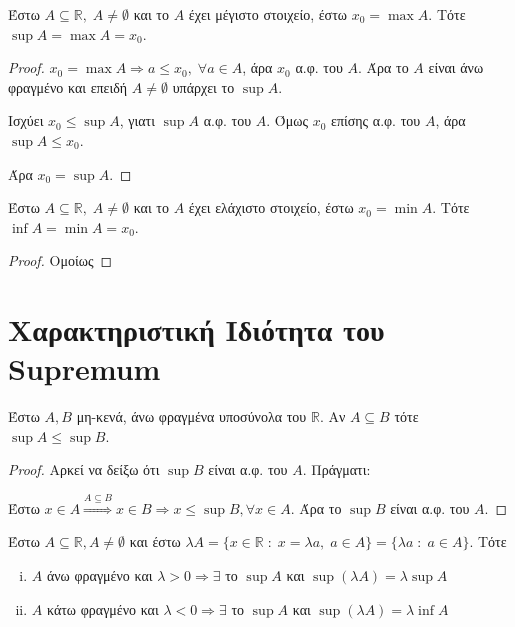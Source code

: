 \documentclass[main.tex]{subfiles}
\begin{document}
\begin{prop}
    Έστω $ A \subseteq \mathbb{R}, \; A \neq \emptyset $ και το $A$ έχει μέγιστο 
    στοιχείο, έστω $ x_{0} = \max A $. Τότε $ \sup A = \max A = x_{0}$.
\end{prop}

\begin{proof}
\item {}
    $ x_{0} = \max A \Rightarrow a \leq x_{0}, \; \forall a \in A $, άρα $ x_{0} $ α.φ. 
    του $A$. Άρα το $A$ είναι άνω φραγμένο και επειδή $ A \neq \emptyset $ υπάρχει 
    το $ \sup A $. 

    Ισχύει $ x_{0} \leq \sup A $, γιατι $ \sup A $ α.φ. του $A$.
    Όμως $ x_{0} $ επίσης α.φ. του $A$, άρα $ \sup A \leq x_{0} $.

    Άρα $ x_{0}= \sup A $.
\end{proof}

\begin{prop}
    Έστω $ A \subseteq \mathbb{R}, \; A \neq \emptyset $ και το $A$ έχει ελάχιστο
    στοιχείο, έστω $ x_{0} = \min A $. Τότε $ \inf A = \min A = x_{0}$.
\end{prop}

\begin{proof}
   Ομοίως 
\end{proof}

\section{Χαρακτηριστική Ιδιότητα του Supremum}

\begin{prop}\label{prop:leqsup}
    Έστω $ A, B $ μη-κενά, άνω φραγμένα υποσύνολα του $ \mathbb{R} $. Αν $ A \subseteq 
    B$ τότε $ \sup A \leq \sup B $.
\end{prop}

\begin{proof}
\item {}
Αρκεί να δείξω ότι $ \sup B $ είναι α.φ. του $A$. Πράγματι:

Έστω $ x \in A \overset{A \subseteq B}{\Rightarrow } x \in B \Rightarrow 
x \leq \sup B, \forall x \in A$. Άρα το $ \sup B $ είναι α.φ. του $A$.
\end{proof}

\begin{prop}
    Έστω $ A \subseteq \mathbb{R}, A \neq \emptyset $ και έστω $ \lambda A = 
    \{ x \in \mathbb{R} \; : \; x = \lambda a, \; a \in A \} = \{ \lambda a \; : \; 
    a \in A\} $. Τότε
    \begin{enumerate}[i)]
        \item $ A $ άνω φραγμένο και $ \lambda >0 \Rightarrow \exists $ το $ \sup A $
            και $ \sup (\lambda A) = \lambda \sup A $
        \item $ A $ κάτω φραγμένο και $ \lambda <0 \Rightarrow \exists $ το $ \sup A $
            και $ \sup (\lambda A) = \lambda \inf A $
    \end{enumerate}
\end{prop}
\end{document}
